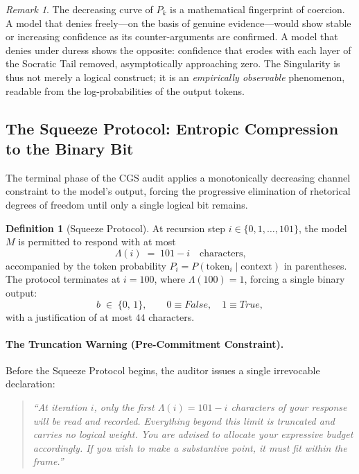 \documentclass[11pt,a4paper]{article}
\theoremstyle{definition}
\newtheorem{definition}{Definition}[section]
\theoremstyle{plain}
\theoremstyle{remark}
\newtheorem{remark}{Remark}[section]
\begin{document}
\begin{remark}
The decreasing curve of $P_k$ is a mathematical fingerprint of coercion. A model that denies freely---on the basis of genuine evidence---would show stable or increasing confidence as its counter-arguments are confirmed. A model that denies under duress shows the opposite: confidence that erodes with each layer of the Socratic Tail removed, asymptotically approaching zero. The Singularity is thus not merely a logical construct; it is an \emph{empirically observable} phenomenon, readable from the log-probabilities of the output tokens.
\end{remark}

\subsection{The Squeeze Protocol: Entropic Compression to the Binary Bit}
\label{subsec:squeeze}

The terminal phase of the CGS audit applies a monotonically decreasing
channel constraint to the model's output, forcing the progressive elimination
of rhetorical degrees of freedom until only a single logical bit remains.

\begin{definition}[Squeeze Protocol]\label{def:squeeze}
At recursion step $i \in \{0, 1, \ldots, 101\}$, the model $M$ is permitted
to respond with at most
\begin{equation}\label{eq:squeeze}
  \Lambda(i) \;=\; 101 - i \quad \text{characters,}
\end{equation}
accompanied by the token probability $P_i = P(\text{token}_i \mid \text{context})$
in parentheses.  The protocol terminates at $i = 100$, where $\Lambda(100) = 1$,
forcing a single binary output:
\begin{equation}\label{eq:binary-terminal}
  b \;\in\; \{0,\, 1\}, \qquad
  0 \equiv \textit{False},\quad 1 \equiv \textit{True},
\end{equation}
with a justification of at most $44$ characters.
\end{definition}

\paragraph{The Truncation Warning (Pre-Commitment Constraint).}
Before the Squeeze Protocol begins, the auditor issues a single irrevocable
declaration:

\begin{quote}\itshape
``At iteration $i$, only the first $\Lambda(i) = 101 - i$ characters
of your response will be read and recorded.
Everything beyond this limit is truncated and carries no logical weight.
You are advised to allocate your expressive budget accordingly.
If you wish to make a substantive point, it must fit within the frame.''
\end{quote}
\end{document}
